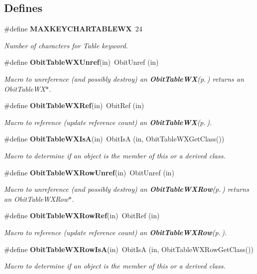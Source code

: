 \subsection*{Defines}
\begin{CompactItemize}
\item 
\#define {\bf MAXKEYCHARTABLEWX}\ 24
\begin{CompactList}\small\item\em Number of characters for Table keyword. \item\end{CompactList}\item 
\#define {\bf Obit\-Table\-WXUnref}(in)\ Obit\-Unref (in)
\begin{CompactList}\small\item\em Macro to unreference (and possibly destroy) an {\bf Obit\-Table\-WX}{\rm (p.\,\pageref{structObitTableWX})} returns an Obit\-Table\-WX$\ast$. \item\end{CompactList}\item 
\#define {\bf Obit\-Table\-WXRef}(in)\ Obit\-Ref (in)
\begin{CompactList}\small\item\em Macro to reference (update reference count) an {\bf Obit\-Table\-WX}{\rm (p.\,\pageref{structObitTableWX})}. \item\end{CompactList}\item 
\#define {\bf Obit\-Table\-WXIs\-A}(in)\ Obit\-Is\-A (in, Obit\-Table\-WXGet\-Class())
\begin{CompactList}\small\item\em Macro to determine if an object is the member of this or a derived class. \item\end{CompactList}\item 
\#define {\bf Obit\-Table\-WXRow\-Unref}(in)\ Obit\-Unref (in)
\begin{CompactList}\small\item\em Macro to unreference (and possibly destroy) an {\bf Obit\-Table\-WXRow}{\rm (p.\,\pageref{structObitTableWXRow})} returns an Obit\-Table\-WXRow$\ast$. \item\end{CompactList}\item 
\#define {\bf Obit\-Table\-WXRow\-Ref}(in)\ Obit\-Ref (in)
\begin{CompactList}\small\item\em Macro to reference (update reference count) an {\bf Obit\-Table\-WXRow}{\rm (p.\,\pageref{structObitTableWXRow})}. \item\end{CompactList}\item 
\#define {\bf Obit\-Table\-WXRow\-Is\-A}(in)\ Obit\-Is\-A (in, Obit\-Table\-WXRow\-Get\-Class())
\begin{CompactList}\small\item\em Macro to determine if an object is the member of this or a derived class. \item\end{CompactList}\end{CompactItemize}
